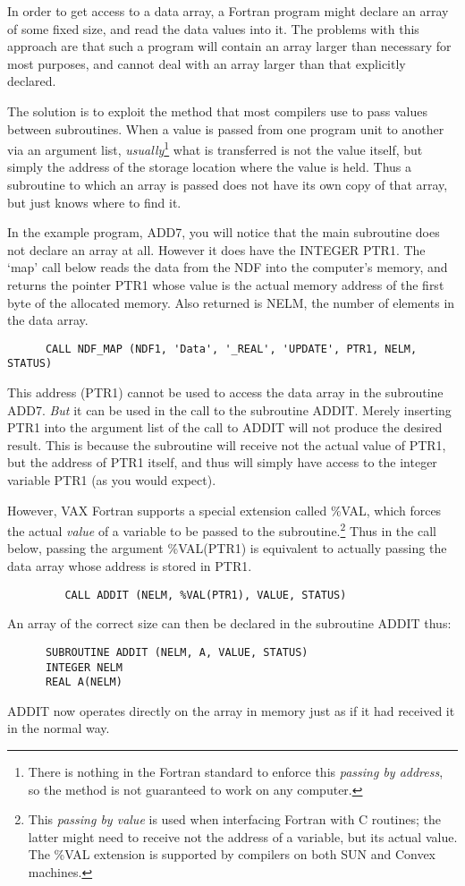 In order to get access to a data array, a Fortran program might 
declare an array of some fixed size, and read the data values 
into it.
The problems with this approach are that such a program will 
contain an array larger than necessary for most purposes, and
cannot deal with an array larger than that explicitly declared.

The solution is to exploit the method that most compilers
use to pass values between subroutines.
When a value is passed from one program unit to another via an argument 
list, 
{\sl usually}\footnote{There is nothing in the Fortran standard to enforce this
{\sl passing by address}, so the method is not guaranteed to work on any
computer.}
what is transferred is not the value itself, but simply the address of the 
storage location where the value is held.
Thus a subroutine to which an array is passed does not have its own copy
of that array, but just knows where to find it.

In the example program, ADD7, you will notice that the main subroutine does not
declare an array at all.
However it does have the INTEGER PTR1.
The `map' call below reads the data from the NDF into the computer's 
memory, and
returns the pointer PTR1 whose value  is the actual memory address of
the first byte of the allocated memory.
Also returned is NELM, the number of elements in the data array.
\begin{verbatim}
      CALL NDF_MAP (NDF1, 'Data', '_REAL', 'UPDATE', PTR1, NELM, STATUS)
\end{verbatim}
This address (PTR1) cannot be used to access  the data array in the subroutine 
ADD7.
{\sl But\/} it can be used in the call to the subroutine ADDIT.
Merely inserting PTR1 into the argument list of the call to 
ADDIT will not produce the desired result.
This is  because the subroutine will receive not 
the actual value of PTR1,
but the address of PTR1 itself, and thus will simply have access to
the integer variable PTR1  (as you would expect).

However, VAX Fortran supports a special extension called \%VAL, which forces 
the actual  {\sl value\/}
of a variable to be passed to the 
subroutine.\footnote{This {\sl passing by value\/} is used when interfacing 
Fortran
with C routines; the latter might need to receive not the address of a
variable, but its actual value.
The \%VAL extension is supported by compilers on both SUN and Convex machines.} 
Thus in  the call below, passing the argument \%VAL(PTR1) is equivalent
to actually passing the data array whose address is stored in PTR1.
\begin{verbatim}
         CALL ADDIT (NELM, %VAL(PTR1), VALUE, STATUS)             
\end{verbatim}
An array of the correct size  can then be declared in the subroutine ADDIT 
thus:
\begin{verbatim}
      SUBROUTINE ADDIT (NELM, A, VALUE, STATUS)                 
      INTEGER NELM
      REAL A(NELM)
\end{verbatim}
ADDIT now operates directly on the array in memory just as if it had 
received it in the normal way.

